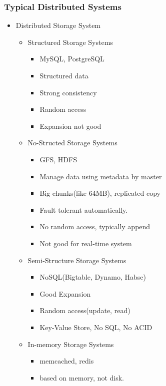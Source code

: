 \begin{frame}[allowframebreaks]
    \frametitle{Typical Distributed Systems}
    \begin{itemize}
        \item Distributed Storage System
        \begin{itemize}
            \item Structured Storage Systems
            \begin{itemize}
                \item MySQL, PostgreSQL
                \item Structured data
                \item Strong consistency
                \item Random access
                \item Expansion not good
            \end{itemize}
            \item No-Structed Storage Systems
            \begin{itemize}
                \item GFS, HDFS
                \item Manage data using metadata by master
                \item Big chunks(like 64MB), replicated copy
                \item Fault tolerant automatically.
                \item No random access, typically append
                \item Not good for real-time system
            \end{itemize}
            \item Semi-Structure Storage Systems
            \begin{itemize}
                \item NoSQL(Bigtable, Dynamo, Habse)
                \item Good Expansion
                \item Random access(update, read)
                \item Key-Value Store, No SQL, No ACID
            \end{itemize}
            \item In-memory Storage Systems
            \begin{itemize}
                \item memcached, redis
                \item based on memory, not disk.

\end{itemize}
\end{itemize}
\end{itemize}
\end{frame}
